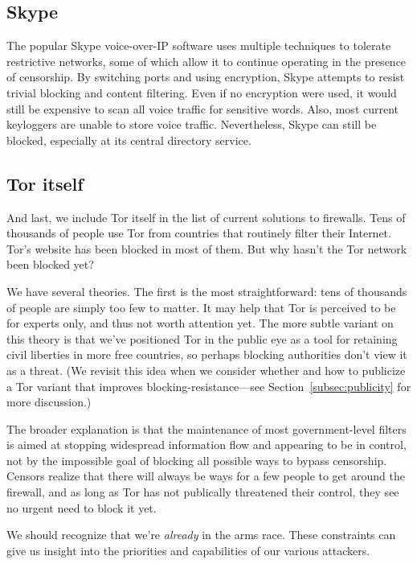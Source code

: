 \documentclass{llncs}
\begin{document}
\subsection{Skype}

The popular Skype voice-over-IP software uses multiple techniques to tolerate
restrictive networks, some of which allow it to continue operating in the
presence of censorship.  By switching ports and using encryption, Skype
attempts to resist trivial blocking and content filtering.  Even if no
encryption were used, it would still be expensive to scan all voice
traffic for sensitive words.  Also, most current keyloggers are unable to
store voice traffic.  Nevertheless, Skype can still be blocked, especially at
its central directory service.

\subsection{Tor itself}

And last, we include Tor itself in the list of current solutions
to firewalls. Tens of thousands of people use Tor from countries that
routinely filter their Internet. Tor's website has been blocked in most
of them. But why hasn't the Tor network been blocked yet?

We have several theories. The first is the most straightforward: tens of
thousands of people are simply too few to matter. It may help that Tor is
perceived to be for experts only, and thus not worth attention yet. The
more subtle variant on this theory is that we've positioned Tor in the
public eye as a tool for retaining civil liberties in more free countries,
so perhaps blocking authorities don't view it as a threat. (We revisit
this idea when we consider whether and how to publicize a Tor variant
that improves blocking-resistance---see Section~\ref{subsec:publicity}
for more discussion.)

The broader explanation is that the maintenance of most government-level
filters is aimed at stopping widespread information flow and appearing to be
in control, not by the impossible goal of blocking all possible ways to bypass
censorship. Censors realize that there will always
be ways for a few people to get around the firewall, and as long as Tor
has not publically threatened their control, they see no urgent need to
block it yet.

We should recognize that we're \emph{already} in the arms race. These
constraints can give us insight into the priorities and capabilities of
our various attackers.
\end{document}
